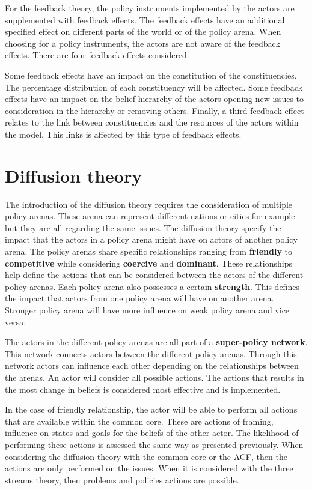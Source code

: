 \documentclass{article}
\begin{document}
For the feedback theory, the policy instruments implemented by the actors are supplemented with feedback effects. The feedback effects have an additional specified effect on different parts of the world or of the policy arena. When choosing for a policy instruments, the actors are not aware of the feedback effects. There are four feedback effects considered.

Some feedback effects have an impact on the constitution of the constituencies. The percentage distribution of each constituency will be affected. Some feedback effects have an impact on the belief hierarchy of the actors opening new issues to consideration in the hierarchy or removing others. Finally, a third feedback effect relates to the link between constituencies and the resources of the actors within the model. This links is affected by this type of feedback effects.

\section{Diffusion theory}

The introduction of the diffusion theory requires the consideration of multiple policy arenas. These arena can represent different nations or cities for example but they are all regarding the same issues. The diffusion theory specify the impact that the actors in a policy arena might have on actors of another policy arena. The policy arenas share specific relationships ranging from {\bfseries friendly} to {\bfseries competitive} while considering {\bfseries coercive} and {\bfseries dominant}. These relationships help define the actions that can be considered between the actors of the different policy arenas. Each policy arena also possesses a certain {\bfseries strength}. This defines the impact that actors from one policy arena will have on another arena. Stronger policy arena will have more influence on weak policy arena and vice versa.

The actors in the different policy arenas are all part of a {\bfseries super-policy network}. This network connects actors between the different policy arenas. Through this network actors can influence each other depending on the relationships between the arenas. An actor will consider all possible actions. The actions that results in the most change in beliefs is considered most effective and is implemented.

In the case of friendly relationship, the actor will be able to perform all actions that are available within the common core. These are actions of framing, influence on states and goals for the beliefs of the other actor. The likelihood of performing these actions is assessed the same way as presented previously. When considering the diffusion theory with the common core or the ACF, then the actions are only performed on the issues. When it is considered with the three streams theory, then problems and policies actions are possible.
\end{document}
